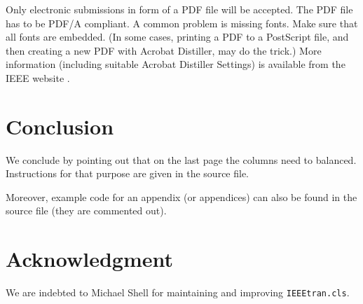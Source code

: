 \documentclass[conference,letterpaper]{IEEEtran}
\begin{document}
Only electronic submissions in form of a PDF file will be
accepted. The PDF file has to be PDF/A compliant. A common problem is
missing fonts. Make sure that all fonts are embedded. (In some cases,
printing a PDF to a PostScript file, and then creating a new PDF with
Acrobat Distiller, may do the trick.) More information (including
suitable Acrobat Distiller Settings) is available from the IEEE
website \cite{IEEE:pdfsettings, IEEE:AuthorToolbox}.


\section{Conclusion}

We conclude by pointing out that on the last page the columns need to
balanced. Instructions for that purpose are given in the source file.

Moreover, example code for an appendix (or appendices) can also be
found in the source file (they are commented out).



\section*{Acknowledgment}

We are indebted to Michael Shell for maintaining and improving
\texttt{IEEEtran.cls}. 




%
%
\end{document}
